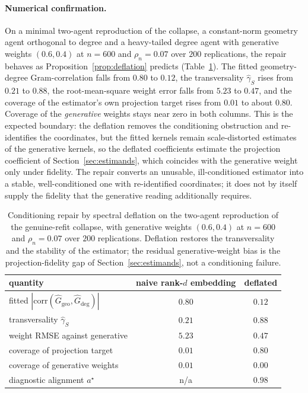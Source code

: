 \documentclass[12pt]{article}
\newcommand{\1}{\mathbf{1}}
\begin{document}
\paragraph{Numerical confirmation.} On a minimal two-agent reproduction of the collapse, a constant-norm geometry agent orthogonal to degree and a heavy-tailed degree agent with generative weights $(0.6,0.4)$ at $n=600$ and $\rho_n=0.07$ over $200$ replications, the repair behaves as Proposition~\ref{prop:deflation} predicts (Table~\ref{tab:deflation}). The fitted geometry-degree Gram-correlation falls from $0.80$ to $0.12$, the transversality $\widehat\gamma_S$ rises from $0.21$ to $0.88$, the root-mean-square weight error falls from $5.23$ to $0.47$, and the coverage of the estimator's own projection target rises from $0.01$ to about $0.80$. Coverage of the \emph{generative} weights stays near zero in both columns. This is the expected boundary: the deflation removes the conditioning obstruction and re-identifies the coordinates, but the fitted kernels remain scale-distorted estimates of the generative kernels, so the deflated coefficients estimate the projection coefficient of Section~\ref{sec:estimands}, which coincides with the generative weight only under fidelity. The repair converts an unusable, ill-conditioned estimator into a stable, well-conditioned one with re-identified coordinates; it does not by itself supply the fidelity that the generative reading additionally requires.

\begin{table}[t]
\centering
\small
\caption{Conditioning repair by spectral deflation on the two-agent reproduction of the genuine-refit collapse, with generative weights $(0.6,0.4)$ at $n=600$ and $\rho_n=0.07$ over $200$ replications. Deflation restores the transversality and the stability of the estimator; the residual generative-weight bias is the projection-fidelity gap of Section~\ref{sec:estimands}, not a conditioning failure.}
\label{tab:deflation}
\begin{tabular}{lcc}
\toprule
quantity & naive rank-$d$ embedding & deflated \\
\midrule
fitted $|\mathrm{corr}(\widehat G_{\mathrm{geo}},\widehat G_{\deg})|$ & $0.80$ & $0.12$\\
transversality $\widehat\gamma_S$ & $0.21$ & $0.88$\\
weight RMSE against generative & $5.23$ & $0.47$\\
coverage of projection target & $0.01$ & $0.80$\\
coverage of generative weights & $0.01$ & $0.00$\\
diagnostic alignment $a^\star$ & n/a & $0.98$\\
\bottomrule
\end{tabular}
\end{table}
\end{document}
